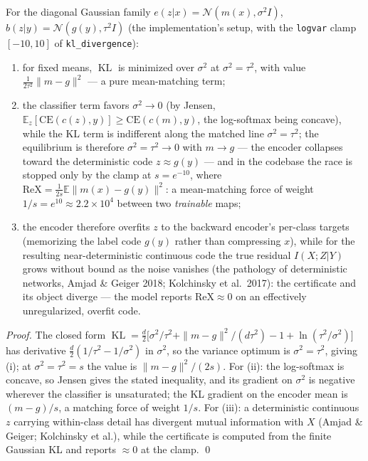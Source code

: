 \begin{proposition}\label{prop:variance}
For the diagonal Gaussian family $e(z|x) = \mathcal{N}(m(x), \sigma^2 I)$,
$b(z|y) = \mathcal{N}(g(y), \tau^2 I)$ (the implementation's setup, with the
\texttt{logvar} clamp $[-10, 10]$ of \texttt{kl\_divergence}):
\begin{enumerate}
\item[(i)] for fixed means, $\operatorname{KL}$ is minimized over $\sigma^2$ at
$\sigma^2 = \tau^2$, with value $\tfrac{1}{2\tau^2}\|m - g\|^2$ --- a pure mean-matching
term;
\item[(ii)] the classifier term favors $\sigma^2 \to 0$ (by Jensen,
$\mathbb{E}_z[\mathrm{CE}(c(z), y)] \ge \mathrm{CE}(c(m), y)$, the log-softmax being
concave), while the KL term is indifferent along the matched line $\sigma^2 = \tau^2$;
the equilibrium is therefore $\sigma^2 = \tau^2 \to 0$ with $m \to g$ --- the encoder
collapses toward the deterministic code $z \approx g(y)$ --- and in the codebase the race
is stopped only by the clamp at $s = e^{-10}$, where
$\mathrm{ReX} = \tfrac{1}{2s}\mathbb{E}\|m(x) - g(y)\|^2$: a mean-matching force of
weight $1/s = e^{10} \approx 2.2\times10^{4}$ between two \emph{trainable} maps;
\item[(iii)] the encoder therefore overfits $z$ to the backward encoder's per-class
targets (memorizing the label code $g(y)$ rather than compressing $x$), while for the
resulting near-deterministic continuous code the true residual $I(X;Z|Y)$ grows without
bound as the noise vanishes (the pathology of deterministic networks, Amjad \& Geiger
2018; Kolchinsky et al.\ 2017): the certificate and its object diverge --- the model
reports $\mathrm{ReX} \approx 0$ on an effectively unregularized, overfit code.
\end{enumerate}
\end{proposition}

\begin{proof}
The closed form
$\operatorname{KL} = \tfrac{d}{2}\big[\sigma^2/\tau^2 + \|m-g\|^2/(d\tau^2)
- 1 + \ln(\tau^2/\sigma^2)\big]$ has derivative $\tfrac{d}{2}(1/\tau^2 - 1/\sigma^2)$
in $\sigma^2$, so the variance optimum is $\sigma^2 = \tau^2$, giving (i); at
$\sigma^2 = \tau^2 = s$ the value is $\|m-g\|^2/(2s)$. For (ii): the log-softmax is
concave, so Jensen gives the stated inequality, and its gradient on $\sigma^2$ is
negative wherever the classifier is unsaturated; the KL gradient on the encoder mean is
$(m - g)/s$, a matching force of weight $1/s$. For (iii): a deterministic continuous $z$
carrying within-class detail has divergent mutual information with $X$ (Amjad \& Geiger;
Kolchinsky et al.), while the certificate is computed from the finite Gaussian KL and
reports $\approx 0$ at the clamp. \hfill\qed
\end{proof}

